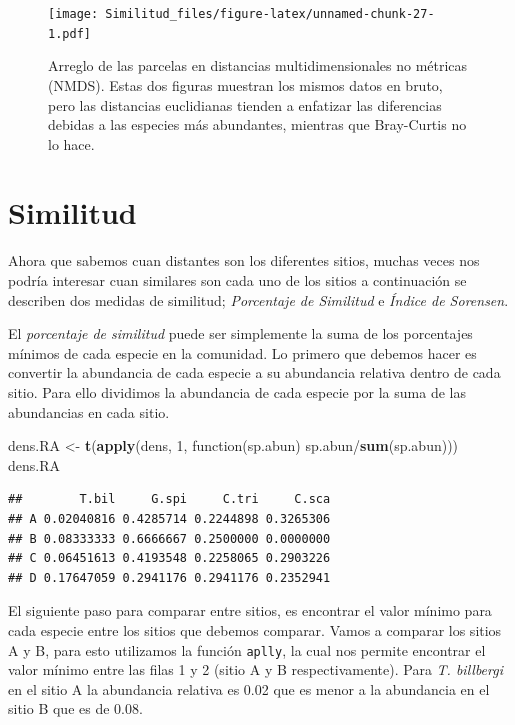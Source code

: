 \documentclass[]{book}
\newenvironment{Shaded}{\begin{snugshade}}{\end{snugshade}}
\newcommand{\KeywordTok}[1]{\textcolor[rgb]{0.13,0.29,0.53}{\textbf{{#1}}}}
\newcommand{\DecValTok}[1]{\textcolor[rgb]{0.00,0.00,0.81}{{#1}}}
\newcommand{\StringTok}[1]{\textcolor[rgb]{0.31,0.60,0.02}{{#1}}}
\newcommand{\NormalTok}[1]{{#1}}
\begin{document}
\begin{figure}[htbp]
\centering
\texttt{[image: Similitud\_files/figure-latex/unnamed-chunk-27-1.pdf]}
\caption{\label{fig:unnamed-chunk-27}Arreglo de las parcelas en distancias
multidimensionales no métricas (NMDS). Estas dos figuras muestran los
mismos datos en bruto, pero las distancias euclidianas tienden a
enfatizar las diferencias debidas a las especies más abundantes,
mientras que Bray-Curtis no lo hace.}
\end{figure}

\section{Similitud}\label{similitud-1}

Ahora que sabemos cuan distantes son los diferentes sitios, muchas veces
nos podría interesar cuan similares son cada uno de los sitios a
continuación se describen dos medidas de similitud; \emph{Porcentaje de
Similitud} e \emph{Índice de Sorensen}.

El \emph{porcentaje de similitud} puede ser simplemente la suma de los
porcentajes mínimos de cada especie en la comunidad. Lo primero que
debemos hacer es convertir la abundancia de cada especie a su abundancia
relativa dentro de cada sitio. Para ello dividimos la abundancia de cada
especie por la suma de las abundancias en cada sitio.

\begin{Shaded}
\begin{Highlighting}[]
\NormalTok{dens.RA <-}\StringTok{ }\KeywordTok{t}\NormalTok{(}\KeywordTok{apply}\NormalTok{(dens, }\DecValTok{1}\NormalTok{, function(sp.abun) sp.abun/}\KeywordTok{sum}\NormalTok{(sp.abun)))}
\NormalTok{dens.RA}
\end{Highlighting}
\end{Shaded}

\begin{verbatim}
##        T.bil     G.spi     C.tri     C.sca
## A 0.02040816 0.4285714 0.2244898 0.3265306
## B 0.08333333 0.6666667 0.2500000 0.0000000
## C 0.06451613 0.4193548 0.2258065 0.2903226
## D 0.17647059 0.2941176 0.2941176 0.2352941
\end{verbatim}

El siguiente paso para comparar entre sitios, es encontrar el valor
mínimo para cada especie entre los sitios que debemos comparar. Vamos a
comparar los sitios A y B, para esto utilizamos la función
\texttt{aplly}, la cual nos permite encontrar el valor mínimo entre las
filas 1 y 2 (sitio A y B respectivamente). Para \emph{T. billbergi} en
el sitio A la abundancia relativa es 0.02 que es menor a la abundancia
en el sitio B que es de 0.08.
\end{document}
